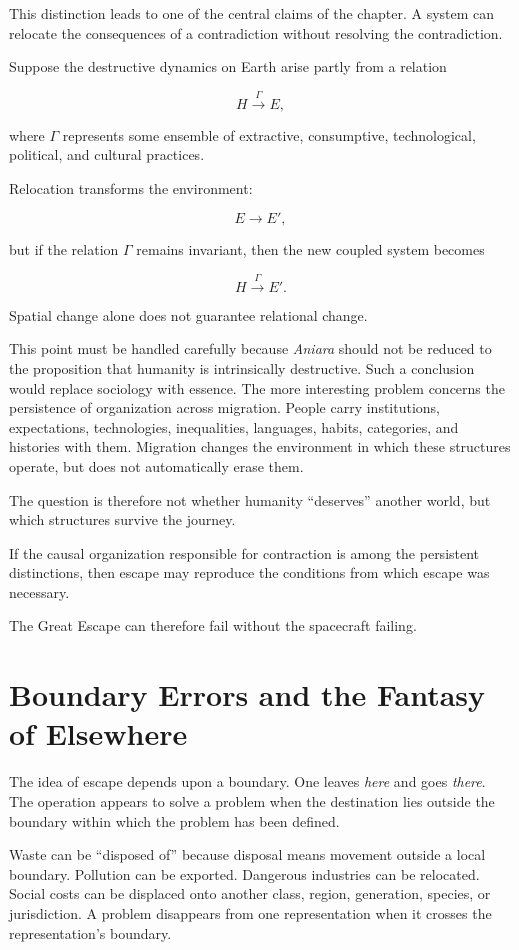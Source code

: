 \documentclass[11pt,oneside]{book}
\theoremstyle{definition}
\theoremstyle{remark}
\begin{document}
This distinction leads to one of the central claims of the chapter. A system can relocate the consequences of a contradiction without resolving the contradiction.

Suppose the destructive dynamics on Earth arise partly from a relation

\[
H\overset{\Gamma}{\longrightarrow}E,
\]

where \(\Gamma\) represents some ensemble of extractive, consumptive, technological, political, and cultural practices.

Relocation transforms the environment:

\[
E\rightarrow E',
\]

but if the relation \(\Gamma\) remains invariant, then the new coupled system becomes

\[
H\overset{\Gamma}{\longrightarrow}E'.
\]

Spatial change alone does not guarantee relational change.

This point must be handled carefully because \emph{Aniara} should not be reduced to the proposition that humanity is intrinsically destructive. Such a conclusion would replace sociology with essence. The more interesting problem concerns the persistence of organization across migration. People carry institutions, expectations, technologies, inequalities, languages, habits, categories, and histories with them. Migration changes the environment in which these structures operate, but does not automatically erase them.

The question is therefore not whether humanity ``deserves'' another world, but which structures survive the journey.

If the causal organization responsible for contraction is among the persistent distinctions, then escape may reproduce the conditions from which escape was necessary.

The Great Escape can therefore fail without the spacecraft failing.

\section{Boundary Errors and the Fantasy of Elsewhere}

The idea of escape depends upon a boundary. One leaves \emph{here} and goes \emph{there}. The operation appears to solve a problem when the destination lies outside the boundary within which the problem has been defined.

Waste can be ``disposed of'' because disposal means movement outside a local boundary. Pollution can be exported. Dangerous industries can be relocated. Social costs can be displaced onto another class, region, generation, species, or jurisdiction. A problem disappears from one representation when it crosses the representation's boundary.
\end{document}
